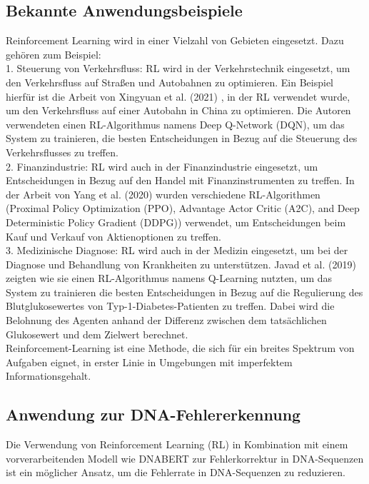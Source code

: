 \documentclass[oneside,bibliography=totocnumbered,BCOR=5mm]{scrbook}%
\theoremstyle{definition}
\theoremstyle{definition}
\theoremstyle{definition}
\theoremstyle{definition}
\theoremstyle{definition}
\theoremstyle{definition}
\begin{document}
\subsection{Bekannte Anwendungsbeispiele}


Reinforcement Learning wird in einer Vielzahl von Gebieten eingesetzt. 
Dazu gehören zum Beispiel:\\


1. Steuerung von Verkehrsfluss: RL wird in der Verkehrstechnik eingesetzt, um den Verkehrsfluss auf 
Straßen und Autobahnen zu optimieren. 
Ein Beispiel hierfür ist die Arbeit von Xingyuan et al. (2021) \autocite{RLTrafficControl}, in der RL verwendet wurde, 
um den Verkehrsfluss auf einer Autobahn in China zu optimieren. 
Die Autoren verwendeten einen RL-Algorithmus namens Deep Q-Network (DQN), um das System zu trainieren, 
die besten Entscheidungen in Bezug auf die Steuerung des Verkehrsflusses zu treffen.\\


2. Finanzindustrie: RL wird auch in der Finanzindustrie eingesetzt, um Entscheidungen in Bezug 
auf den Handel mit Finanzinstrumenten zu treffen. 
In der Arbeit von Yang et al. (2020) \autocite{RLStock} wurden verschiedene RL-Algorithmen (Proximal Policy Optimization (PPO), 
Advantage Actor Critic (A2C), and Deep Deterministic Policy Gradient (DDPG)) verwendet, 
um Entscheidungen beim Kauf und Verkauf von Aktienoptionen zu treffen.\\


3. Medizinische Diagnose: RL wird auch in der Medizin eingesetzt, um bei der Diagnose und Behandlung von Krankheiten zu unterstützen. 
Javad et al. (2019) \autocite{RLDiabetes} zeigten wie sie einen RL-Algorithmus namens Q-Learning nutzten, 
um das System zu trainieren die besten Entscheidungen in Bezug auf die Regulierung des Blutglukosewertes von 
Typ-1-Diabetes-Patienten zu treffen. Dabei wird die Belohnung des Agenten anhand der Differenz zwischen dem
tatsächlichen Glukosewert und dem Zielwert berechnet.\\


Reinforcement-Learning ist eine Methode, die sich für ein breites Spektrum von
Aufgaben eignet, in erster Linie in Umgebungen mit imperfektem Informationsgehalt. 


\subsection{Anwendung zur DNA-Fehlererkennung}
Die Verwendung von Reinforcement Learning (RL) in Kombination mit einem vorverarbeitenden Modell wie DNABERT 
zur Fehlerkorrektur in DNA-Sequenzen ist ein möglicher Ansatz, um die Fehlerrate in DNA-Sequenzen zu reduzieren.
\end{document}
